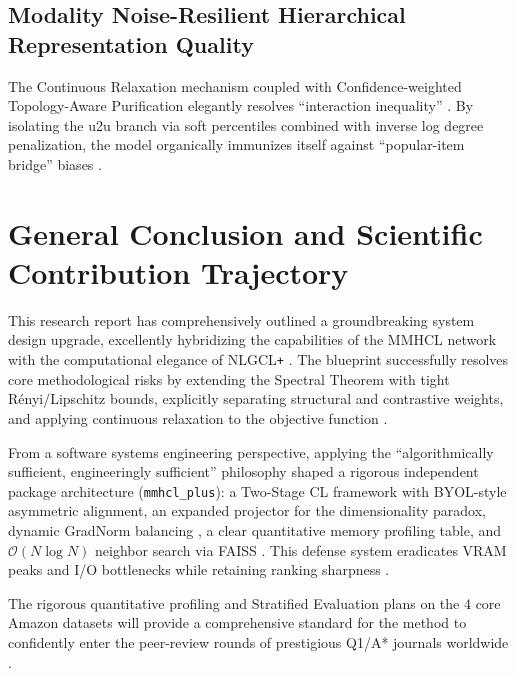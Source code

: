     \subsection{Modality Noise-Resilient Hierarchical Representation Quality}
    
    The Continuous Relaxation mechanism coupled with Confidence-weighted Topology-Aware Purification elegantly resolves ``interaction inequality'' \cite{guo2025mmhcl, feng2025nlgcl}. By isolating the u2u branch via soft percentiles combined with inverse log degree penalization, the model organically immunizes itself against ``popular-item bridge'' biases \cite{chakraborty2021fashionrecsurvey, skillsmuggler2024beautyratings}.
    
    \section{General Conclusion and Scientific Contribution Trajectory}
    
    This research report has comprehensively outlined a groundbreaking system design upgrade, excellently hybridizing the capabilities of the MMHCL network with the computational elegance of NLGCL\texttt{+} \cite{guo2025mmhcl, feng2025nlgcl}. The blueprint successfully resolves core methodological risks by extending the Spectral Theorem with tight R\'enyi/Lipschitz bounds, explicitly separating structural and contrastive weights, and applying continuous relaxation to the objective function \cite{cover2006elements, zhang2020hypergraphsignalprocessing}.
    
    From a software systems engineering perspective, applying the ``algorithmically sufficient, engineeringly sufficient'' philosophy shaped a rigorous independent package architecture (\texttt{mmhcl\_plus}): a Two-Stage CL framework with BYOL-style asymmetric alignment, an expanded projector for the dimensionality paradox, dynamic GradNorm balancing \cite{chen2018gradnorm}, a clear quantitative memory profiling table, and $\mathcal{O}(N \log N)$ neighbor search via FAISS \cite{johnson2019faiss}. This defense system eradicates VRAM peaks and I/O bottlenecks while retaining ranking sharpness \cite{zbontar2021barlowtwins, bardes2022vicreg, grill2020byol}.
    
    The rigorous quantitative profiling and Stratified Evaluation plans on the 4 core Amazon datasets will provide a comprehensive standard for the method to confidently enter the peer-review rounds of prestigious Q1/A* journals worldwide \cite{evidently2024ndcg, tds2023rankingmetrics}.
    
    \vspace{1em}
    \renewcommand{\refname}{Works Cited}
    \printbibliography
    
    
    